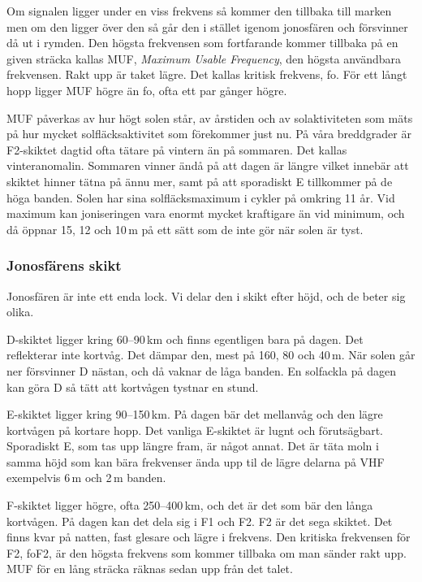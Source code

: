 Om signalen ligger under en viss frekvens så kommer den tillbaka till
marken men om den ligger över den så går den i stället igenom
jonosfären och försvinner då ut i rymden. Den högsta frekvensen som
fortfarande kommer tillbaka på en given sträcka kallas MUF,
\textit{Maximum Usable Frequency}, den högsta användbara
frekvensen. Rakt upp är taket lägre. Det kallas kritisk frekvens,
fo. För ett långt hopp ligger MUF högre än fo, ofta ett par gånger
högre.

MUF påverkas av hur högt solen står, av årstiden och av solaktiviteten
som mäts på hur mycket solfläcksaktivitet som förekommer just nu. På
våra breddgrader är F2-skiktet dagtid ofta tätare på vintern än på
sommaren. Det kallas vinteranomalin. Sommaren vinner ändå på att dagen
är längre vilket innebär att skiktet hinner tätna på ännu mer, samt på
att sporadiskt E tillkommer på de höga banden. Solen har sina
solfläcksmaximum i cykler på omkring 11 år. Vid maximum kan
joniseringen vara enormt mycket kraftigare än vid minimum, och då
öppnar 15, 12 och 10\,m på ett sätt som de inte gör när solen är tyst.

\subsubsection{Jonosfärens skikt}

Jonosfären är inte ett enda lock. Vi delar den i skikt efter höjd, och
de beter sig olika.

D-skiktet ligger kring 60--90\,km och finns egentligen bara på
dagen. Det reflekterar inte kortvåg. Det dämpar den, mest på 160, 80
och 40\,m. När solen går ner försvinner D nästan, och då vaknar de
låga banden. En solfackla på dagen kan göra D så tätt att kortvågen
tystnar en stund.

E-skiktet ligger kring 90--150\,km. På dagen bär det mellanvåg och den
lägre kortvågen på kortare hopp. Det vanliga E-skiktet är lugnt och
förutsägbart. Sporadiskt E, som tas upp längre fram, är något
annat. Det är täta moln i samma höjd som kan bära frekvenser ända upp
til de lägre delarna på VHF exempelvis 6\,m och 2\,m banden.

F-skiktet ligger högre, ofta 250--400\,km, och det är det som bär den
långa kortvågen. På dagen kan det dela sig i F1 och F2. F2 är det sega
skiktet. Det finns kvar på natten, fast glesare och lägre i
frekvens. Den kritiska frekvensen för F2, foF2, är den högsta frekvens
som kommer tillbaka om man sänder rakt upp. MUF för en lång sträcka
räknas sedan upp från det talet.

